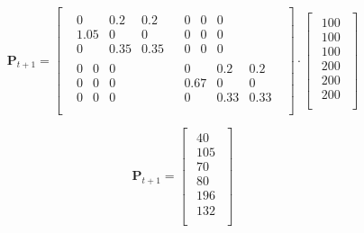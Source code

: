 \documentclass[12pt]{article}
\begin{document}
\begin{equation} 
\mathbf{P}_{t+1} =  
\begin{bmatrix}
\begin{array}{c|c}
\begin{matrix} 0 & 0.2 & 0.2 \\ 1.05 & 0 & 0 \\ 0 & 0.35 & 0.35 \end{matrix} &
\begin{matrix} 0 & 0 & 0 \\ 0 & 0 & 0 \\ 0 & 0 & 0 \end{matrix} \\
\hline
\begin{matrix} 0 & 0 & 0 \\ 0 & 0 & 0 \\ 0 & 0 & 0 \end{matrix} &
\begin{matrix} 0 & 0.2 & 0.2 \\ 0.67 & 0 & 0 \\ 0 & 0.33 & 0.33 \end{matrix} \\
\end{array}
\end{bmatrix}
\cdot
\begin{bmatrix}
\begin{array}{c}
100 \\
100 \\
100 \\
\hline
200\\
200\\
200\\
\end{array}
\end{bmatrix} \nonumber
\end{equation}

\begin{equation} 
\mathbf{P}_{t+1} =  \begin{bmatrix}
\begin{array}{c}
40 \\
105 \\
70 \\
\hline
80\\
196\\
132\\
\end{array}
\end{bmatrix} 
\end{equation}
\end{document}
